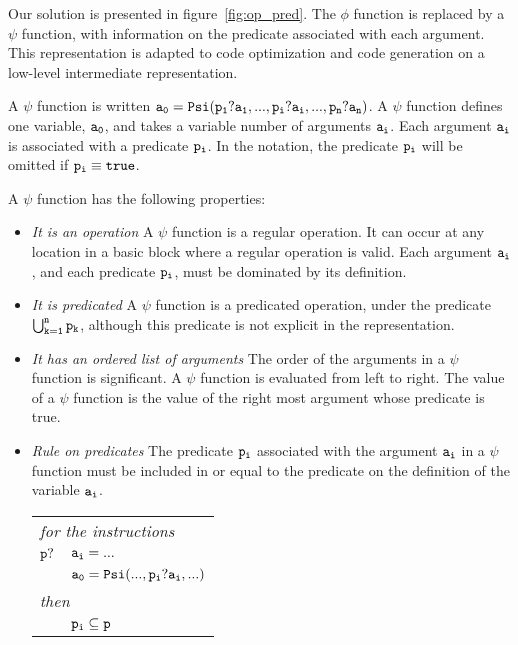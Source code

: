 Our solution is presented in figure~\ref{fig:op_pred}. The $\phi$
function is replaced by a $\psi$ function, with information on the
predicate associated with each argument. This representation is
adapted to code optimization and code generation on a low-level
intermediate representation.

A $\psi$ function is written ${\tt a_0 = Psi(p_1?a_1, ..., p_i?a_i,
  ..., p_n?a_n)}$. A $\psi$ function defines one variable, ${\tt
  a_0}$, and takes a variable number of arguments ${\tt a_i}$. Each
argument ${\tt a_i}$ is associated with a predicate ${\tt p_i}$. In
the notation, the predicate ${\tt p_i}$ will be omitted if ${\tt p_i
  \equiv true}$.

A $\psi$ function has the following properties:

\begin{itemize}

\item{\emph{It is an operation}} A $\psi$ function is a regular operation. It
  can occur at any location in a basic block where a regular operation
  is valid. Each argument ${\tt a_i}$, and each predicate ${\tt p_i}$,
  must be dominated by its definition.

\item{\emph{It is predicated}} A $\psi$ function is a predicated
  operation, under the predicate ${\tt \bigcup_{k=1}^n p_k}$,
  although this predicate is not explicit in the representation.

\item{\emph{It has an ordered list of arguments}} The order of the
  arguments in a $\psi$ function is significant. A $\psi$ function is
  evaluated from left to right. The value of a $\psi$ function is the
  value of the right most argument whose predicate is true.

\item{\emph{Rule on predicates}} The predicate ${\tt p_i}$ associated
  with the argument ${\tt a_i}$ in a $\psi$ function must be included
  in or equal to the predicate on the definition of the variable ${\tt
    a_i}$.

\begin{tabular}{ll}
\multicolumn{2}{l}{\it for the instructions}\\
${\tt p?}$ & ${\tt a_i = ...}$\\
& ${\tt a_0 = Psi(..., p_i?a_i, ...)}$\\
\multicolumn{2}{l}{\it then}\\
& ${\tt p_i} \subseteq {\tt p}$\\
\end{tabular}

\end{itemize}

